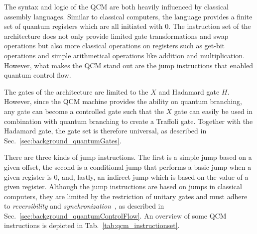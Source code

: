 The syntax and logic of the QCM are both heavily influenced by classical assembly languages. Similar to classical computers,
the language provides a finite set of quantum registers which are all initiated with $0$. The instruction set of the architecture does not only provide limited gate transformations and swap operations but also more classical operations on registers such as get-bit operations and simple arithmetical operations like addition and multiplication. However, what makes the QCM stand out are the jump instructions that enabled quantum control flow.

The gates of the architecture are limited to the $X$ and Hadamard gate $H$. However, since the QCM machine provides  the ability on quantum branching, any gate can become a controlled gate such that the $X$ gate can easily be used in combination with quantum branching to create a Traffoli gate. Together with the Hadamard gate, the gate set is therefore universal, as described in Sec.~\ref{sec:background_quantumGates}.

There are three kinds of jump instructions. The first is a simple jump based on a given offset, the second is a conditional jump that performs a basic jump when a given register is $0$, and, lastly, an indirect jump which is based on the value of a given register. Although the jump instructions are based on jumps in classical computers, they are limited by the restriction of unitary gates and must adhere to \emph{reversibility} and \emph{synchronization}~\cite{YVC24}, as described in Sec.~\ref{sec:background_quantumControlFlow}. An overview of some QCM instructions is depicted in Tab.~\ref{tab:qcm_instructionset}.

